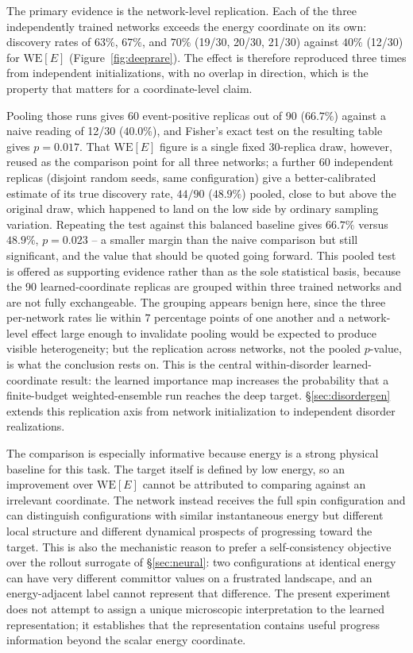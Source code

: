 \documentclass[a4paper,fleqn]{cas-sc}
\newcommand{\WE}{\mathrm{WE}}
\begin{document}
The primary evidence is the network-level replication. Each of the three independently
trained networks exceeds the energy coordinate on its own: discovery rates of $63\%$, $67\%$,
and $70\%$ (19/30, 20/30, 21/30) against $40\%$ (12/30) for $\WE[E]$
(Figure~\ref{fig:deeprare}). The effect is therefore
reproduced three times from independent initializations, with no overlap in direction, which is
the property that matters for a coordinate-level claim.

Pooling those runs gives 60 event-positive replicas out of 90 ($66.7\%$) against a naive
reading of 12/30 ($40.0\%$), and Fisher's exact test on the resulting table gives $p=0.017$.
That $\WE[E]$ figure is a single fixed 30-replica draw, however, reused as the comparison
point for all three networks; a further 60 independent replicas (disjoint random seeds, same
configuration) give a better-calibrated estimate of its true discovery rate, $44/90$
($48.9\%$) pooled, close to but above the original draw, which happened to land on the low
side by ordinary sampling variation. Repeating the test against this balanced baseline gives
$66.7\%$ versus $48.9\%$, $p=0.023$ -- a smaller margin than the naive comparison but still
significant, and the value that should be quoted going forward. This pooled test is
offered as supporting evidence rather than as the sole statistical basis, because the 90
learned-coordinate replicas are grouped within three trained networks and are not fully
exchangeable. The grouping appears benign here, since the three per-network rates lie within
$7$ percentage points of one another and a network-level effect large enough to invalidate
pooling would be expected to produce visible heterogeneity; but the replication across networks,
not the pooled $p$-value, is what the conclusion rests on. This is the central within-disorder
learned-coordinate result: the learned importance map increases the probability that a
finite-budget weighted-ensemble run reaches the deep target. \S\ref{sec:disordergen} extends
this replication axis from network initialization to independent disorder realizations.

The comparison is especially informative because energy is a strong physical baseline for this
task. The target itself is defined by low energy, so an improvement over $\WE[E]$ cannot be
attributed to comparing against an irrelevant coordinate. The network instead receives the full
spin configuration and can distinguish configurations with similar instantaneous energy but
different local structure and different dynamical prospects of progressing toward the target.
This is also the mechanistic reason to prefer a self-consistency objective over the rollout
surrogate of \S\ref{sec:neural}: two configurations at identical energy can have very different
committor values on a frustrated landscape, and an energy-adjacent label cannot represent that
difference. The present experiment does not attempt to assign a unique microscopic
interpretation to the learned representation; it establishes that the representation contains
useful progress information beyond the scalar energy coordinate.
\end{document}
